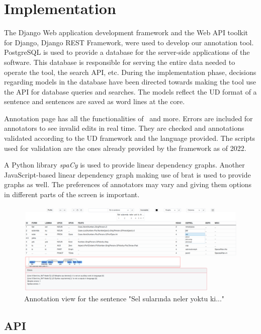 \section{Implementation}
\label{sec:implementation}

The Django\cite{django} Web application development framework and the Web API toolkit for Django, Django REST Framework\cite{drf}, were used to develop our annotation tool.
PostgreSQL\cite{psql} is used to provide a database for the server-side applications of the software.
This database is responsible for serving the entire data needed to operate the tool, the search API, etc.
During the implementation phase, decisions regarding models in the database have been directed towards making the tool use the API for database queries and searches.
The models reflect the UD format of a sentence and sentences are saved as word lines at the core.

Annotation page has all the functionalities of \boatvone\ and more.
Errors are included for annotators to see invalid edits in real time.
They are checked and annotations validated according to the UD framework and the language provided.
The scripts used for validation are the ones already provided by the framework as of 2022.\cite{UD-git}

A Python library \textit{spaCy}\cite{spacy} is used to provide linear dependency graphs.
Another JavaScript-based linear dependency graph\cite{spyssalo} making use of brat\cite{brat-vis} is used to provide graphs as well.
The preferences of annotators may vary and giving them options in different parts of the screen is important.

\begin{figure}[tbh]
    \centering
    \includegraphics[width=1\textwidth]{figures/1.png}
    \caption{Annotation view for the sentence "Sel sularında neler yoktu ki..."}
    \label{fig:demo-fig}
\end{figure}

\subsection{API}
\label{sec:api}

